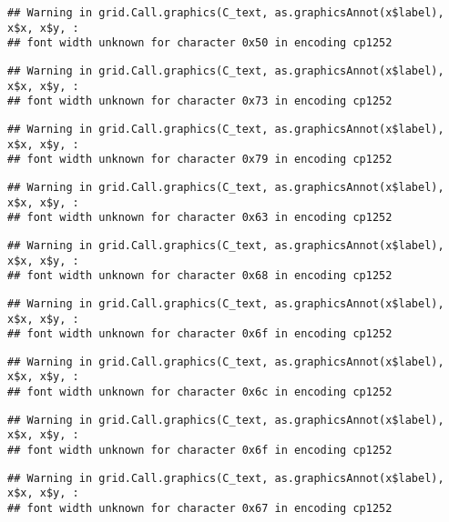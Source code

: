 \documentclass[
]{article}
\begin{document}
\begin{verbatim}
## Warning in grid.Call.graphics(C_text, as.graphicsAnnot(x$label), x$x, x$y, :
## font width unknown for character 0x50 in encoding cp1252
\end{verbatim}

\begin{verbatim}
## Warning in grid.Call.graphics(C_text, as.graphicsAnnot(x$label), x$x, x$y, :
## font width unknown for character 0x73 in encoding cp1252
\end{verbatim}

\begin{verbatim}
## Warning in grid.Call.graphics(C_text, as.graphicsAnnot(x$label), x$x, x$y, :
## font width unknown for character 0x79 in encoding cp1252
\end{verbatim}

\begin{verbatim}
## Warning in grid.Call.graphics(C_text, as.graphicsAnnot(x$label), x$x, x$y, :
## font width unknown for character 0x63 in encoding cp1252
\end{verbatim}

\begin{verbatim}
## Warning in grid.Call.graphics(C_text, as.graphicsAnnot(x$label), x$x, x$y, :
## font width unknown for character 0x68 in encoding cp1252
\end{verbatim}

\begin{verbatim}
## Warning in grid.Call.graphics(C_text, as.graphicsAnnot(x$label), x$x, x$y, :
## font width unknown for character 0x6f in encoding cp1252
\end{verbatim}

\begin{verbatim}
## Warning in grid.Call.graphics(C_text, as.graphicsAnnot(x$label), x$x, x$y, :
## font width unknown for character 0x6c in encoding cp1252
\end{verbatim}

\begin{verbatim}
## Warning in grid.Call.graphics(C_text, as.graphicsAnnot(x$label), x$x, x$y, :
## font width unknown for character 0x6f in encoding cp1252
\end{verbatim}

\begin{verbatim}
## Warning in grid.Call.graphics(C_text, as.graphicsAnnot(x$label), x$x, x$y, :
## font width unknown for character 0x67 in encoding cp1252
\end{verbatim}
\end{document}
